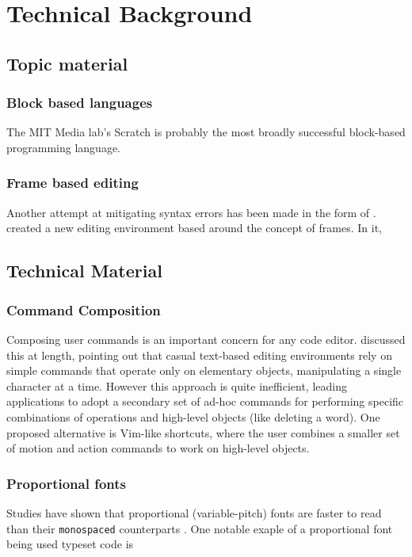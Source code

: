 \chapter{Technical Background}

\section{Topic material}

\subsection{Block based languages}

The MIT Media lab's Scratch \citep{Maloney2010} is probably the most broadly
successful block-based programming language.


\subsection{Frame based editing}

Another attempt at mitigating syntax errors has been made in the form of
.  \citet{Kolling2017} created a new
editing environment based around the concept of frames. In it, 

\section{Technical Material}

\subsection{Command Composition}
Composing user commands is an important concern for any code editor.
\citet{Chodarev2016} discussed this at length, pointing out that casual
text-based editing environments rely on simple commands that operate only on
elementary objects, manipulating a single character at a time. However this
approach is quite inefficient, leading applications to adopt a secondary set of
ad-hoc commands for performing specific combinations of operations and
high-level objects (like deleting a word). One proposed alternative is
Vim-like shortcuts, where the user combines a smaller set of motion and action
commands to work on high-level objects.

\subsection{Proportional fonts}
Studies have shown that
proportional (variable-pitch) fonts are
faster to read than their \texttt{monospaced} counterparts \citep{Campbell1981, Beldie1983}. One notable exaple
of a proportional font being used typeset code is 

